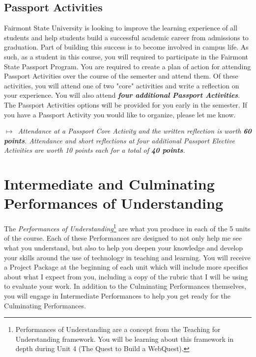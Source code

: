 \documentclass{tufte-handout}
\begin{document}
\subsection{Passport Activities}
Fairmont State University is looking to improve the learning experience of all students and help students build a successful academic career from admissions to graduation. Part of building this success is to become involved in campus life. As such, as a student in this course, you will required to participate in the Fairmont State Passport Program. You are required to create a plan of action for attending Passport Activities over the course of the semester and attend them. Of these activities, you will attend one of two "core" activities and write a reflection on your experience. You will also attend \textit{\textbf{four additional Passport Activities}}. The Passport Activities options will be provided for you early in the semester. If you have a Passport Activity you would like to organize, please let me know.

\medskip\noindent\textit{$\mapsto$~Attendance at a Passport Core Activity and the written reflection is worth \textbf{60 points}. Attendance and short reflections at four additional Passport Elective Activities are worth 10 points each for a total of \textbf{40 points}.}

\section{Intermediate and Culminating Performances of Understanding}

The \textit{Performances of Understanding}\footnote{Performances of Understanding are a concept from the Teaching for Understanding framework. You will be learning about this framework in depth during Unit 4 (The Quest to Build a WebQuest).} are what you produce in each of the 5 units of the course. Each of these Performances are designed to not only help me see what you understand, but also to help you deepen your knowledge and develop your skills around the use of technology in teaching and learning. You will receive a \textsf{Project Package} at the beginning of each unit which will include more specifics about what I expect from you, including a copy of the rubric that I will be using to evaluate your work. In addition to the Culminating Performances themselves, you will engage in Intermediate Performances to help you get ready for the Culminating Performances.
\end{document}
